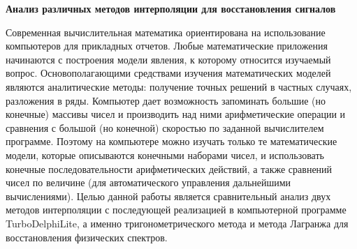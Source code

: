
\begin{center}
\bf   \textbf{Анализ различных методов интерполяции для восстановления сигналов}
\end{center}

Современная вычислительная математика ориентирована на использование компьютеров для прикладных отчетов. Любые математические приложения начинаются с построения модели явления, к которому относится изучаемый вопрос. Основополагающими средствами изучения математических моделей являются аналитические методы: получение точных решений в частных случаях, разложения в ряды. Компьютер дает возможность запоминать большие (но конечные) массивы чисел и производить над ними арифметические операции и сравнения с большой (но конечной) скоростью по заданной вычислителем программе. Поэтому на компьютере можно изучать только те математические модели, которые описываются конечными наборами чисел, и использовать конечные последовательности арифметических действий, а также сравнений чисел по величине (для автоматического управления дальнейшими вычислениями). Целью данной работы является сравнительный анализ двух методов интерполяции с последующей реализацией в компьютерной программе TurboDelphiLite, а именно тригонометрического метода и метода Лагранжа для восстановления физических спектров.
